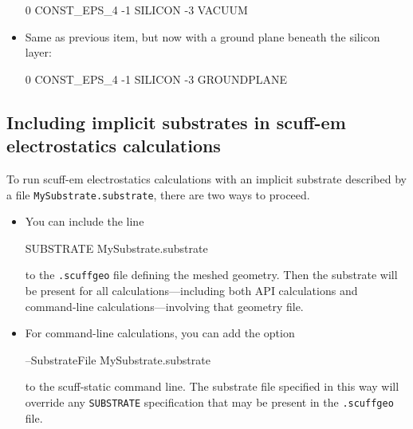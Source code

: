\documentclass[letterpaper]{article}
\begin{document}
\begin{itemize}
\medskip
\begin{verbcode}
 0 CONST_EPS_4
-1 SILICON
-3 VACUUM
\end{verbcode}

\item Same as previous item, but now with a ground plane beneath
the silicon layer:

\medskip
\begin{verbcode}
 0 CONST_EPS_4
-1 SILICON
-3 GROUNDPLANE
\end{verbcode}
\medskip
\end{itemize}

\subsection{Including implicit substrates in {\sc scuff-em} electrostatics
            calculations}

To run {\sc scuff-em} electrostatics calculations with an implicit 
substrate described by a file \texttt{MySubstrate.substrate},
there are two ways to proceed.

\begin{itemize}
 \item You can include the line

       \begin{verbcode}
         SUBSTRATE MySubstrate.substrate
       \end{verbcode}

       to the \texttt{.scuffgeo} file defining the meshed geometry.
       Then the substrate will be present for all calculations---including
       both API calculations and command-line calculations---involving 
       that geometry file.
 \item For command-line calculations, you can add the option

       \begin{verbcode}
       --SubstrateFile MySubstrate.substrate
       \end{verbcode}

       to the {\sc scuff-static} command line. 
       The substrate file specified in this way will override
       any \texttt{SUBSTRATE} specification that may be present
       in the \texttt{.scuffgeo} file.
\end{itemize}
\end{document}
